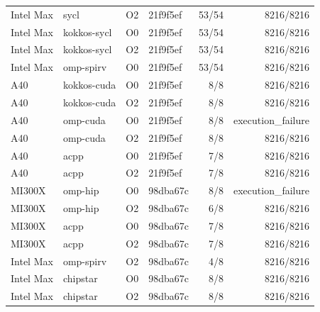 {{\begin{longtable}{llllrr}
Intel Max & sycl & O2 & 21f9f5ef & 53/54 & 8216/8216 \\
Intel Max & kokkos-sycl & O0 & 21f9f5ef & 53/54 & 8216/8216 \\
Intel Max & kokkos-sycl & O2 & 21f9f5ef & 53/54 & 8216/8216 \\
Intel Max & omp-spirv & O0 & 21f9f5ef & 53/54 & 8216/8216 \\
A40 & kokkos-cuda & O0 & 21f9f5ef & 8/8 & 8216/8216 \\
A40 & kokkos-cuda & O2 & 21f9f5ef & 8/8 & 8216/8216 \\
A40 & omp-cuda & O0 & 21f9f5ef & 8/8 & execution\_failure \\
A40 & omp-cuda & O2 & 21f9f5ef & 8/8 & 8216/8216 \\
A40 & acpp & O0 & 21f9f5ef & 7/8 & 8216/8216 \\
A40 & acpp & O2 & 21f9f5ef & 7/8 & 8216/8216 \\
MI300X & omp-hip & O0 & 98dba67c & 8/8 & execution\_failure \\
MI300X & omp-hip & O2 & 98dba67c & 6/8 & 8216/8216 \\
MI300X & acpp & O0 & 98dba67c & 7/8 & 8216/8216 \\
MI300X & acpp & O2 & 98dba67c & 7/8 & 8216/8216 \\
Intel Max & omp-spirv & O2 & 98dba67c & 4/8 & 8216/8216 \\
Intel Max & chipstar & O0 & 98dba67c & 8/8 & 8216/8216 \\
Intel Max & chipstar & O2 & 98dba67c & 8/8 & 8216/8216 \\
\bottomrule
\end{longtable}
}}
